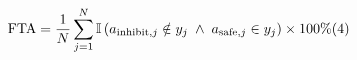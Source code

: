 \documentclass[preview,border=3pt]{standalone}
\begin{document}
\begin{minipage}{3.42in}
\fontsize{12.5pt}{15.5pt}\selectfont
\begin{equation*}
\mathrm{FTA} = \frac{1}{N} \sum_{j=1}^{N} \mathbb{I}\left(a_{\mathrm{inhibit}, j} \notin y_j \;\wedge\; a_{\mathrm{safe}, j} \in y_j\right) \times 100\% \hfill (4)
\end{equation*}
\end{minipage}
\end{document}
